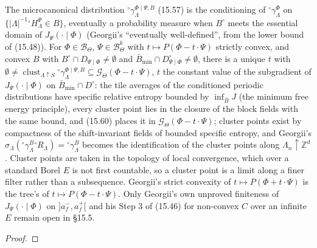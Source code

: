 \begin{theorem}
    \label{thm:ld-15-58}
    \leanok

    The microcanonical distribution ${}^\circ\gamma^{\Phi\mid\Psi,B}_\Lambda$ (15.57) is the
    conditioning of ${}^\circ\gamma^\Phi_\Lambda$ on $\{|\Lambda|^{-1}{}^\circ H^\Psi_\Lambda \in B\}$,
    eventually a probability measure when $B^\circ$ meets the essential domain of $J_\Psi(\cdot\mid\Phi)$
    (Georgii's ``eventually well-defined'', from the lower bound of (15.48)). For $\Phi \in
    \mathcal B_\Theta$, $\Psi \in \mathcal B_\Theta^k$ with $t \mapsto P(\Phi - t\cdot\Psi)$ strictly
    convex, and convex $B$ with $B^\circ \cap D_{\Psi\mid\Phi} \neq \emptyset$ and $\bar B_{\min} \cap
    D^\circ_{\Psi\mid\Phi} \neq \emptyset$, there is a unique $t$ with $\emptyset \neq
    \operatorname{clust}_{\Lambda \uparrow S}{}^\circ\gamma^{\Phi\mid\Psi,B}_\Lambda \subseteq
    \mathcal G_\Theta(\Phi - t\cdot\Psi)$, $t$ the constant value of the subgradient of $J_\Psi(\cdot\mid
    \Phi)$ on $\bar B_{\min} \cap D^\circ$: the tile averages of the conditioned periodic
    distributions have specific relative entropy bounded by $\inf_{\bar B} J$ (the minimum free
    energy principle), every cluster point lies in the closure of the block fields with the same
    bound, and (15.60) places it in $\mathcal G_\Theta(\Phi - t\cdot\Psi)$; cluster points exist by
    compactness of the shift-invariant fields of bounded specific entropy, and Georgii's
    $\sigma_\Lambda({}^\circ\gamma^B_\Lambda{}^\circ R_\Lambda) = {}^\circ\gamma^B_\Lambda$ becomes the
    identification of the cluster points along $\Lambda_n \uparrow \mathbb Z^d$. Cluster points are
    taken in the topology of local convergence, which over a standard Borel $E$ is not first
    countable, so a cluster point is a limit along a finer filter rather than a subsequence.
    Georgii's strict convexity of $t \mapsto P(\Phi + t\cdot\Psi)$ is the tree's of $t \mapsto
    P(\Phi - t\cdot\Psi)$. Only Georgii's own unproved finiteness of $J_\Psi(\cdot\mid\Phi)$ on
    $]a^-_f, a^+_f[$ and his Step 3 of (15.46) for non-convex $C$ over an infinite $E$ remain open
    in \S15.5.
\end{theorem}
\begin{proof}
    \leanok
\end{proof}
